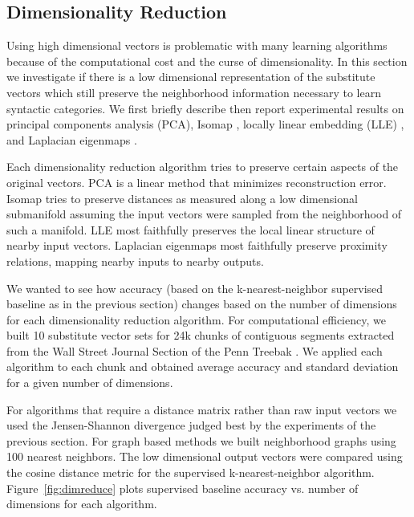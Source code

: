 \subsection{Dimensionality Reduction}
\label{sec:dimreduce}

Using high dimensional vectors is problematic with many learning
algorithms because of the computational cost and the curse of
dimensionality.  In this section we investigate if there is a low
dimensional representation of the substitute vectors which still
preserve the neighborhood information necessary to learn syntactic
categories.  We first briefly describe then report experimental
results on principal components analysis (PCA), Isomap
\cite{tenenbaum2000global}, locally linear embedding (LLE)
\cite{roweis2000nonlinear}, and Laplacian eigenmaps
\cite{belkin2003laplacian}.


Each dimensionality reduction algorithm tries to preserve certain
aspects of the original vectors.  PCA is a linear method that
minimizes reconstruction error.  Isomap tries to preserve distances as
measured along a low dimensional submanifold assuming the input
vectors were sampled from the neighborhood of such a manifold.  LLE
most faithfully preserves the local linear structure of nearby input
vectors.  Laplacian eigenmaps most faithfully preserve proximity
relations, mapping nearby inputs to nearby outputs.

We wanted to see how accuracy (based on the
k-nearest-neighbor supervised baseline as in the previous section)
changes based on the number of dimensions for each dimensionality
reduction algorithm.
%
For computational efficiency, we built 10 substitute vector sets for
24k chunks of contiguous segments extracted from the Wall Street
Journal Section of the Penn Treebak \cite{treebank3}.  We applied each
algorithm to each chunk and obtained average accuracy and standard
deviation for a given  number of dimensions.

For algorithms that require a distance matrix rather than raw input
vectors we used the Jensen-Shannon divergence judged best by the
experiments of the previous section.  For graph based methods we built
neighborhood graphs using 100 nearest neighbors.  The low dimensional
output vectors were compared using the cosine distance metric for the
supervised k-nearest-neighbor algorithm.  Figure~\ref{fig:dimreduce}
plots supervised baseline accuracy vs. number of dimensions for each
algorithm.

